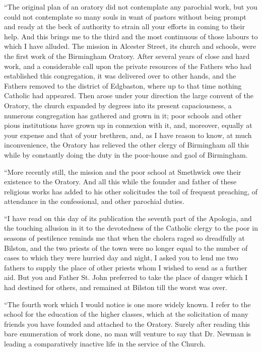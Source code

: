 ``The original plan of an oratory did not contemplate any
parochial work, but you could not contemplate so many souls in want of
pastors without being prompt and ready at the beck of authority to
strain all your efforts in coming to their help. And this brings me to
the third and the most continuous of those labours to which I have
alluded. The mission in Alcester Street, its church and schools,
were the first work of the Birmingham Oratory. After several years of
close and hard work, and a considerable call upon the private resources
of the Fathers who had established this congregation, it was delivered
over to other hands, and the Fathers removed to the district of
Edgbaston, where up to that time nothing Catholic had appeared. Then
arose under your direction the large convent of the Oratory, the church
expanded by degrees into its present capaciousness, a numerous
congregation has gathered and grown in it; poor schools and other pious
institutions have grown up in connexion with it, and, moreover, equally
at your expense and that of your brethren, and, as I have reason to
know, at much inconvenience, the Oratory has relieved the other clergy
of Birmingham all this while by constantly doing the duty in the
poor-house and gaol of Birmingham.

``More recently still, the mission and the poor school at
Smethwick owe their existence to the Oratory. And all this while the
founder and father of these religious works has added to his other
solicitudes the toil of frequent preaching, of attendance in the
confessional, and other parochial duties.

``I have read on this day of its publication the seventh part of
the Apologia, and the touching allusion in it to the devotedness of the
Catholic clergy to the poor in seasons of pestilence reminds me that
when the cholera raged so dreadfully at Bilston, and the two priests of
the town were no longer equal to the number of cases to which they were
hurried day and night, I asked you to lend me two fathers to supply the
place of other priests whom I wished to send as a further aid. But you
and Father St. John preferred to take the place of danger which I had
destined for others, and remained at Bilston till the worst was over.

``The fourth work which I would notice is one more widely known.
I refer to the school for the education of the higher classes, which at
the solicitation of many friends you have founded and attached to the
Oratory. Surely after reading this bare enumeration of work done, no man
will venture to say that Dr. Newman is leading a comparatively inactive
life in the service of the Church.

